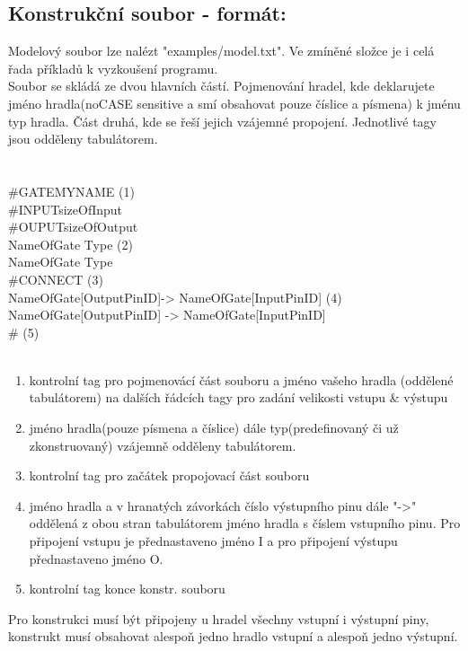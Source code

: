 \documentclass[12pt, oneside]{article}
\newcommand\tab[1][1cm]{\hspace*{#1}}
\begin{document}
\subsection*{Konstrukční soubor - formát:}
Modelový soubor lze nalézt "examples/model.txt".  Ve zmíněné složce je i celá řada příkladů k vyzkoušení programu. \\
Soubor se skládá ze dvou hlavních částí. Pojmenování hradel, kde deklarujete jméno hradla(noCASE sensitive a smí obsahovat pouze číslice a písmena) k jménu typ hradla. Část druhá, kde se řeší jejich vzájemné propojení. Jednotlivé tagy jsou odděleny tabulátorem. \\
\\ \\
\#GATE\tab MYNAME (1) \\
\#INPUT\tab sizeOfInput \\
\#OUPUT\tab sizeOfOutput \\
NameOfGate \tab Type (2)\\
NameOfGate	\tab Type \\
\#CONNECT (3) \\
NameOfGate[OutputPinID]\tab	-> \tab	NameOfGate[InputPinID] (4) \\
NameOfGate[OutputPinID]	 \tab -> \tab	NameOfGate[InputPinID] \\
\# (5) 
\\ \\ 
\begin{enumerate} 
\item kontrolní tag pro pojmenovácí část souboru a jméno vašeho hradla (oddělené tabulátorem) na dalších řádcích tagy pro zadání velikosti vstupu \& výstupu 
\item jméno hradla(pouze písmena a číslice) dále typ(predefinovaný či už zkonstruovaný) vzájemně odděleny tabulátorem. 
\item  kontrolní tag pro začátek propojovací část souboru
\item  jméno hradla a v hranatých závorkách číslo výstupního pinu dále "->" oddělená z obou stran tabulátorem jméno hradla s číslem vstupního pinu. Pro připojení vstupu je přednastaveno jméno I a pro připojení výstupu přednastaveno jméno O.
\item kontrolní tag konce konstr. souboru
\end{enumerate} 
Pro konstrukci musí být připojeny u hradel všechny vstupní i výstupní piny, konstrukt musí obsahovat alespoň jedno hradlo vstupní a alespoň jedno výstupní. 
\end{document}
